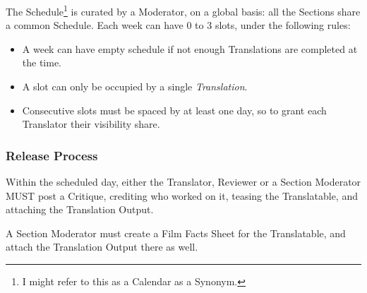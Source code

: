 \documentclass[12pt]{book}
\begin{document}
	The Schedule\footnote{I might refer to this as a Calendar as a Synonym.} is curated by a Moderator, on a global basis: all the Sections share a common Schedule. Each week can have $0$ to $3$ slots, under the following rules:
	
	\begin{itemize}
		\item A week can have empty schedule if not enough Translations are completed at the time.
		\item A slot can only be occupied by a single \emph{Translation}.
		\item Consecutive slots must be spaced by at least one day, so to grant each Translator their visibility share.
	\end{itemize}
	
	\subsubsection{Release Process}
	
	Within the scheduled day, either the Translator, Reviewer or a Section Moderator MUST post a Critique, crediting who worked on it, teasing the Translatable, and attaching the Translation Output.
	
	A Section Moderator must create a Film Facts Sheet for the Translatable, and attach the Translation Output there as well. 
	
\end{document}
